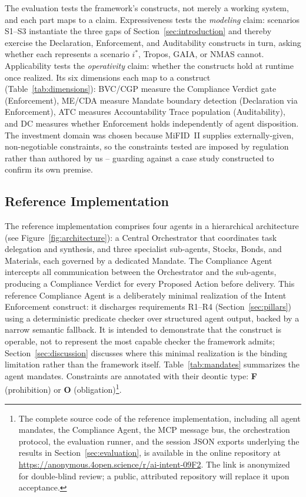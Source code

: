 \documentclass[runningheads]{llncs}
\begin{document}
The evaluation tests the framework's constructs, not merely a working
system, and each part maps to a claim. Expressiveness tests the
\emph{modeling} claim: scenarios S1--S3 instantiate the three gaps of
Section~\ref{sec:introduction} and thereby exercise the Declaration,
Enforcement, and Auditability constructs in turn, asking whether each
represents a scenario $i^*$, Tropos, GAIA, or NMAS cannot. Applicability
tests the \emph{operativity} claim: whether the constructs hold at
runtime once realized. Its six dimensions each map to a construct
(Table~\ref{tab:dimensions}): BVC/CGP measure the Compliance Verdict gate
(Enforcement), ME/CDA measure Mandate boundary detection (Declaration via
Enforcement), ATC measures Accountability Trace population (Auditability),
and DC measures whether Enforcement holds independently of agent
disposition. The investment domain was chosen because MiFID~II supplies
externally-given, non-negotiable constraints, so the constraints tested
are imposed by regulation rather than authored by us -- guarding against
a case study constructed to confirm its own premise.

\subsection{Reference Implementation}
\label{sec:implementation}

The reference implementation comprises four agents in a hierarchical
architecture (see Figure~\ref{fig:architecture}): a Central Orchestrator
that coordinates task delegation and synthesis, and three specialist
sub-agents, Stocks, Bonds, and Materials, each governed by a dedicated
Mandate. The Compliance Agent intercepts all communication between the
Orchestrator and the sub-agents, producing a Compliance Verdict for
every Proposed Action before delivery. This reference Compliance Agent
is a deliberately minimal realization of the Intent Enforcement construct:
it discharges requirements R1--R4 (Section~\ref{sec:pillars}) using a
deterministic predicate checker over structured agent output, backed by a
narrow semantic fallback. It is intended to demonstrate that the
construct is operable, not to represent the most capable checker the
framework admits; Section~\ref{sec:discussion} discusses where this
minimal realization is the binding limitation rather than the framework
itself. Table~\ref{tab:mandates}
summarizes the agent mandates. Constraints are annotated with their
deontic type: \textbf{F} (prohibition) or \textbf{O}
(obligation)\footnote{\label{fn:materials}The complete source code of
the reference implementation, including all agent mandates, the
Compliance Agent, the MCP message bus, the orchestration protocol, the
evaluation runner, and the session JSON exports underlying the results
in Section~\ref{sec:evaluation}, is available in the online repository
at \url{https://anonymous.4open.science/r/ai-intent-09F2}. The link is
anonymized for double-blind review; a public, attributed repository
will replace it upon acceptance.}.
\end{document}
